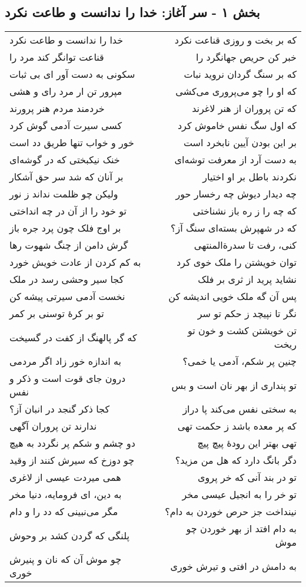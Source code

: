 \begin{center}
\section*{بخش ۱ - سر آغاز: خدا را ندانست و طاعت نکرد}
\label{sec:001}
\begin{longtable}{l p{0.5cm} r}
خدا را ندانست و طاعت نکرد
&&
که بر بخت و روزی قناعت نکرد
\\
قناعت توانگر کند مرد را
&&
خبر کن حریص جهانگرد را
\\
سکونی به دست آور ای بی ثبات
&&
که بر سنگ گردان نروید نبات
\\
مپرور تن ار مرد رای و هشی
&&
که او را چو می‌پروری می‌کشی
\\
خردمند مردم هنر پرورند
&&
که تن پروران از هنر لاغرند
\\
کسی سیرت آدمی گوش کرد
&&
که اول سگ نفس خاموش کرد
\\
خور و خواب تنها طریق دد است
&&
بر این بودن آیین نابخرد است
\\
خنک نیکبختی که در گوشه‌ای
&&
به دست آرد از معرفت توشه‌ای
\\
بر آنان که شد سر حق آشکار
&&
نکردند باطل بر او اختیار
\\
ولیکن چو ظلمت نداند ز نور
&&
چه دیدار دیوش چه رخسار حور
\\
تو خود را از آن در چه انداختی
&&
که چه را ز ره باز نشناختی
\\
بر اوج فلک چون پرد جره باز
&&
که در شهپرش بسته‌ای سنگ آز؟
\\
گرش دامن از چنگ شهوت رها
&&
کنی، رفت تا سدرةالمنتهی
\\
به کم کردن از عادت خویش خورد
&&
توان خویشتن را ملک خوی کرد
\\
کجا سیر وحشی رسد در ملک
&&
نشاید پرید از ثری بر فلک
\\
نخست آدمی سیرتی پیشه کن
&&
پس آن گه ملک خویی اندیشه کن
\\
تو بر کرهٔ توسنی بر کمر
&&
نگر تا نپیچد ز حکم تو سر
\\
که گر پالهنگ از کفت در گسیخت
&&
تن خویشتن کشت و خون تو ریخت
\\
به اندازه خور زاد اگر مردمی
&&
چنین پر شکم، آدمی یا خمی؟
\\
درون جای قوت است و ذکر و نفس
&&
تو پنداری از بهر نان است و بس
\\
کجا ذکر گنجد در انبان آز؟
&&
به سختی نفس می‌کند پا دراز
\\
ندارند تن پروران آگهی
&&
که پر معده باشد ز حکمت تهی
\\
دو چشم و شکم پر نگردد به هیچ
&&
تهی بهتر این رودهٔ پیچ پیچ
\\
چو دوزخ که سیرش کنند از وقید
&&
دگر بانگ دارد که هل من مزید؟
\\
همی میردت عیسی از لاغری
&&
تو در بند آنی که خر پروی
\\
به دین، ای فرومایه، دنیا مخر
&&
تو خر را به انجیل عیسی مخر
\\
مگر می‌نبینی که دد را و دام
&&
نینداخت جز حرص خوردن به دام؟
\\
پلنگی که گردن کشد بر وحوش
&&
به دام افتد از بهر خوردن چو موش
\\
چو موش آن که نان و پنیرش خوری
&&
به دامش در افتی و تیرش خوری
\\
\end{longtable}
\end{center}
